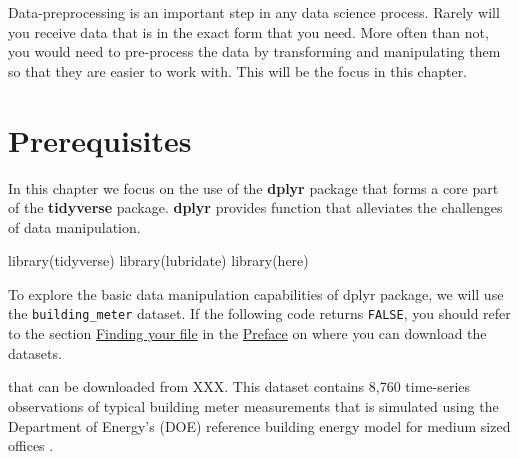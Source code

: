 \documentclass[
]{book}
\newenvironment{Shaded}{\begin{snugshade}}{\end{snugshade}}
\newcommand{\FunctionTok}[1]{\textcolor[rgb]{0.00,0.00,0.00}{#1}}
\newcommand{\NormalTok}[1]{#1}
\begin{document}
Data-preprocessing is an important step in any data science process. Rarely will you receive data that is in the exact form that you need. More often than not, you would need to pre-process the data by transforming and manipulating them so that they are easier to work with. This will be the focus in this chapter.

\hypertarget{prerequisites-6}{%
\section{Prerequisites}\label{prerequisites-6}}

In this chapter we focus on the use of the \textbf{dplyr} package that forms a core part of the \textbf{tidyverse} package. \textbf{dplyr} provides function that alleviates the challenges of data manipulation.

\begin{Shaded}
\begin{Highlighting}[]
\FunctionTok{library}\NormalTok{(tidyverse)}
\FunctionTok{library}\NormalTok{(lubridate)}
\FunctionTok{library}\NormalTok{(here)}
\end{Highlighting}
\end{Shaded}

To explore the basic data manipulation capabilities of dplyr package, we will use the \texttt{building\_meter} dataset. If the following code returns \texttt{FALSE}, you should refer to the section \protect\hyperlink{finding-your-file}{Finding your file} in the \protect\hyperlink{preface}{Preface} on where you can download the datasets.

that can be downloaded from XXX. This dataset contains 8,760 time-series observations of typical building meter measurements that is simulated using the Department of Energy's (DOE) reference building energy model for medium sized offices \citep{deru_us_2011}.
\end{document}
